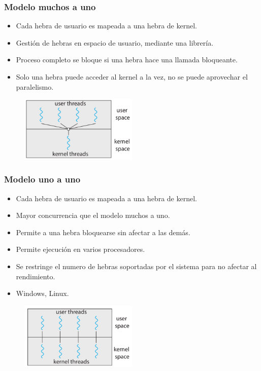 \documentclass{templateNote}
\begin{document}
\subsubsection*{Modelo muchos a uno}
\begin{itemize}
    \item Cada hebra de usuario es mapeada a una hebra de kernel.
    \item Gestión de hebras en espacio de usuario, mediante una librería.
    \item Proceso completo se bloque si una hebra hace una llamada bloqueante.
    \item Solo una hebra puede acceder al kernel a la vez, no se puede aprovechar el paralelismo.
\end{itemize}

\begin{figure}[H]
    \centering
    \includegraphics[width=0.5\textwidth]{img/muchos-uno.png}
\end{figure}

\subsubsection*{Modelo uno a uno}
\begin{itemize}
    \item Cada hebra de usuario es mapeada a una hebra de kernel.
    \item Mayor concurrencia que el modelo muchos a uno.
    \item Permite a una hebra bloquearse sin afectar a las demás.
    \item Permite ejecución en varios procesadores.
    \item Se restringe el numero de hebras soportadas por el sistema para no afectar al rendimiento.
    \item Windows, Linux.
\end{itemize}

\begin{figure}[H]
    \centering
    \includegraphics[width=0.5\textwidth]{img/uno-uno.png}
\end{figure}
\end{document}
